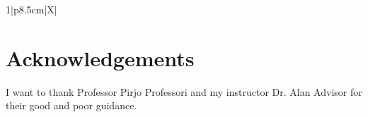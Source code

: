 \documentclass[12pt, a4paper, oneside]{article}
\begin{document}
\begin{table}[h]
\begin{tabularx}{1\textwidth}{|p{8.5cm}|X|}
                                                                                                                                                                                                                                                                                                                                                                                                                                                                                                                                                                                                                                                                                                                                                                                                                                                                                                                                                                                                                                                                                                                                                                                                                                                                                                                                                                                                                             \\[1cm] \hline
    \end{tabularx}
\end{table}

\restoregeometry
\clearpage


\normalsize
\onehalfspacing

\section*{Acknowledgements} \label{sec:acknowledgements}

I want to thank Professor Pirjo Professori and my instructor Dr. Alan Advisor for
their good and poor guidance.

\vspace{1cm}
\end{document}
